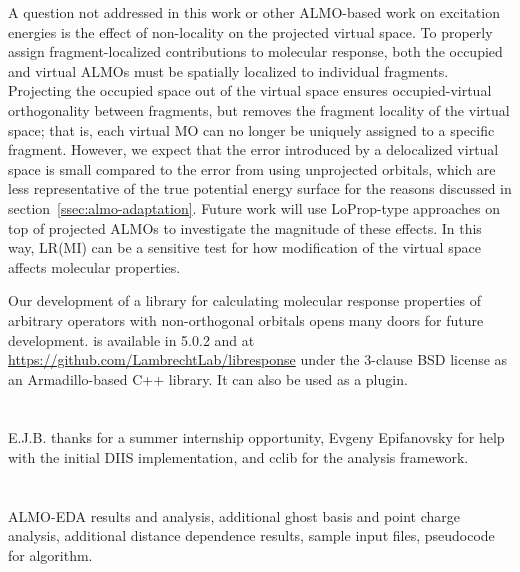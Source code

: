A question not addressed in this work or other ALMO-based work on excitation energies\cite{Closser_2015_5791,doi:10.1063/1.4926837} is the effect of non-locality on the projected virtual space. To properly assign fragment-localized contributions to molecular response, both the occupied and virtual ALMOs must be spatially localized to individual fragments. Projecting the occupied space out of the virtual space ensures occupied-virtual orthogonality between fragments, but removes the fragment locality of the virtual space; that is, each virtual MO can no longer be uniquely assigned to a specific fragment. However, we expect that the error introduced by a delocalized virtual space is small compared to the error from using unprojected orbitals, which are less representative of the true potential energy surface for the reasons discussed in section~\ref{ssec:almo-adaptation}. Future work will use LoProp-type approaches on top of projected ALMOs to investigate the magnitude of these effects. In this way, LR(MI) can be a sensitive test for how modification of the virtual space affects molecular properties.

Our development of a library for calculating molecular response properties of arbitrary operators with non-orthogonal orbitals opens many doors for future development. \libresponse{} is available in \qchem{} 5.0.2 and at \url{https://github.com/LambrechtLab/libresponse} under the 3-clause BSD license as an Armadillo-based\cite{armadillo} C++ library. It can also be used as a \psif{}\cite{Psi41.1} plugin.

\section{\texorpdfstring{}{Acknowledgements}}

E.J.B. thanks \qchem{} for a summer internship opportunity, Evgeny Epifanovsky for help with the initial DIIS implementation, and cclib\cite{OBoyle:2008cc,eric_berquist_2016_60670} for the analysis framework.

\section{\texorpdfstring{}{Supporting Information}}

ALMO-EDA results and analysis, additional ghost basis and point charge analysis, additional distance dependence results, sample input files, pseudocode for algorithm.

